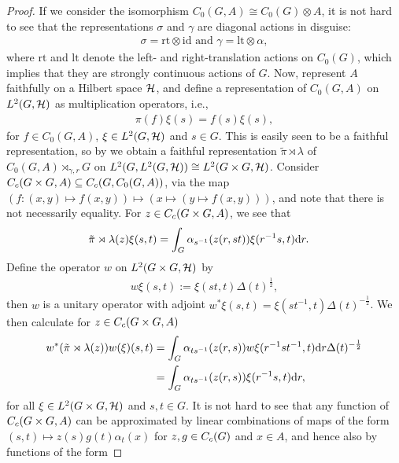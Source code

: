 \begin{proof}
	If we consider the isomorphism $C_0(G, A ) \cong C_0(G) \otimes A$, it is not hard to see that the representations $\sigma$ and $\gamma$ are diagonal actions in disguise: 
	\begin{align*}
		\sigma = \mathrm{rt} \otimes \mathrm{id} \text{  and  } \gamma = \mathrm{lt} \otimes \alpha,
	\end{align*}
	where $\mathrm{rt}$ and $\mathrm{lt}$ denote the left- and right-translation actions on $C_0(G)$, which implies that they are strongly continuous actions of $G$. Now, represent $A$ faithfully on a Hilbert space $\mathcal{H}$, and define a representation of $C_0(G,A)$ on $L^2(G,\mathcal{H})$ as multiplication operators, i.e.,
\begin{align*}
	\pi(f) \xi (s) = f(s)\xi(s), 
\end{align*}
for $f \in C_0(G,A)$, $\xi \in L^2(G,\mathcal{H})$ and $s \in G$. This is easily seen to be a faithful representation, so by  we obtain a faithful representation $\tilde \pi \rtimes \lambda$ of $C_0(G,A) \rtimes_{\gamma,r} G$ on $L^2(G,L^2(G,\mathcal{H})) \cong L^2(G \times G, \mathcal{H})$. Consider $C_c(G \times G,A) \subseteq C_c(G,C_0(G,A))$, via the map $(f \colon (x,y) \mapsto f(x,y)) \mapsto (x \mapsto (y \mapsto f(x,y)))$, and note that there is not necessarily equality. For $z \in C_c(G \times G, A)$, we see that
\begin{align*}
	\tilde \pi \rtimes \lambda (z) \xi(s,t) &= \int_G \alpha_{s^{-1}}(z(r,st)) \xi(r^{-1}s,t) \mathrm{d} r.
\end{align*}
Define the operator $w$ on $L^2(G\times G,\mathcal{H})$ by
\begin{align*}
	w \xi(s,t):= \xi(st,t) \Delta(t)^{\frac12},
\end{align*}
then $w$ is a unitary operator with adjoint $w^* \xi(s,t) = \xi(st^{-1},t) \Delta(t)^{-\frac12}$. We then calculate for $z \in C_c(G \times G, A)$
\begin{align*}
	w^*  (\tilde \pi \rtimes \lambda (z)) w (\xi) (s,t) &= \int_G \alpha_{ts^{-1}} (z(r,s)) w \xi(r^{-1} s t^{-1},t) \mathrm{d} r \Delta(t)^{-\frac12}\\
	&= \int_G \alpha_{ts^{-1}}(z(r,s)) \xi(r^{-1}s,t) \mathrm{d} r,
\end{align*}
for all $\xi \in L^2(G \times G, \mathcal{H})$ and $s,t \in G$. It is not hard to see that any function of $C_c(G \times G , A)$ can be approximated by linear combinations of maps of the form $(s,t) \mapsto z(s)g(t)\alpha_t(x)$ for $z,g \in C_c(G)$ and $x \in A$, and hence also by functions of the form

\end{proof}

